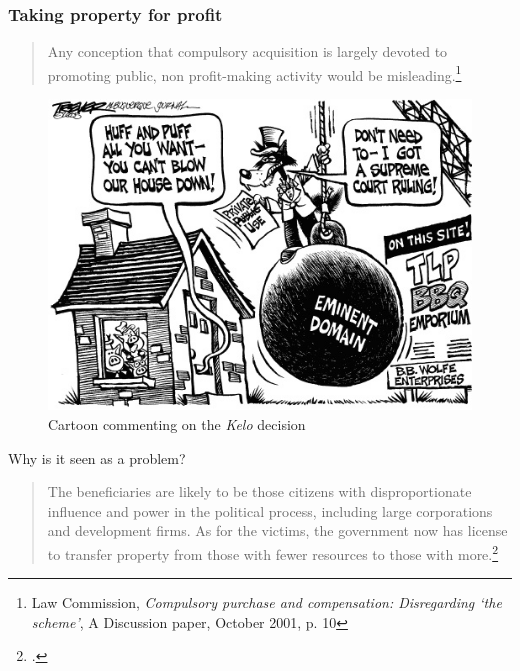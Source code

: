 \documentclass{beamer}
\begin{document}
\begin{frame}
\frametitle{Taking property for profit}
\begin{quote}Any conception that compulsory acquisition is largely
devoted to promoting public, non profit-making activity would be misleading.\footnote{Law Commission, {\it Compulsory purchase and compensation: Disregarding `the scheme'}, A Discussion paper, October 2001, p. 10}\end{quote}
\pause
\begin{figure}\includegraphics[scale=0.5]{huff-and-steal.jpg}\caption{Cartoon commenting on the {\it Kelo} decision}\end{figure}
\end{frame}

\begin{frame}
Why is it seen as a problem?
\pause
\begin{quote}
The beneficiaries are likely to be those citizens with disproportionate influence and power in the political process, including large corporations and development firms. As for the victims, the government now has license to transfer property from those with fewer resources to those with more.\footcite[505]{kelo05}
\end{quote}
\end{frame}
\end{document}
